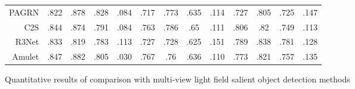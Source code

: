 \begin{table}[p]
{\begin{tabular}{rcccccccccccc}
			PAGRN \upcite{wang2018detect}
			& .822 & .878 & .828 & .084 
			& .717 & .773 & .635 & .114 
			& .727 & .805 & .725 & .147 \\
			
			C2S   \upcite{li2018contour}
			& .844 & .874 & .791 & .084 
			& .763 & .786 & .65  & .111 
			& .806 & .82  & .749 & .113 \\
			
			R3Net  \upcite{deng2018r3net}
			& .833 & .819 & .783 & .113 
			& .727 & .728 & .625 & .151 
			& .789 & .838 & .781 & .128 \\
			
			Amulet \upcite{zhang2017amulet}
			& .847 & .882 & .805 & .030 
			& .767 & .76  & .636 & .110  
			& .773 & .821 & .757 & .135 \\
			
			
			\bottomrule[1.5pt] %
		\end{tabular}
	}
\end{table}
%
%
\begin{table}[t]
	{Quantitative results of comparison with multi-view light field salient object detection methods}
	\centering
	\label{table:comp_multi_view}
\end{table}
